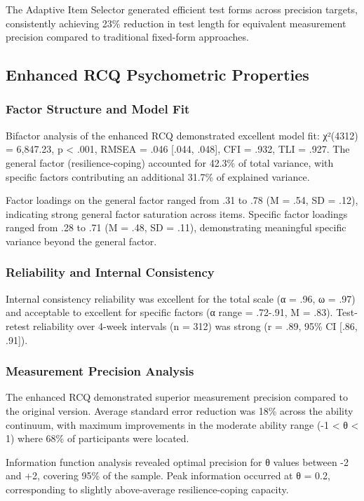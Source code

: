 \documentclass[12pt,a4paper]{article}
\begin{document}
The Adaptive Item Selector generated efficient test forms across precision targets, consistently achieving 23\% reduction in test length for equivalent measurement precision compared to traditional fixed-form approaches.

\subsection{Enhanced RCQ Psychometric Properties}

\subsubsection{Factor Structure and Model Fit}

Bifactor analysis of the enhanced RCQ demonstrated excellent model fit: χ²(4312) = 6,847.23, p < .001, RMSEA = .046 [.044, .048], CFI = .932, TLI = .927. The general factor (resilience-coping) accounted for 42.3\% of total variance, with specific factors contributing an additional 31.7\% of explained variance.

Factor loadings on the general factor ranged from .31 to .78 (M = .54, SD = .12), indicating strong general factor saturation across items. Specific factor loadings ranged from .28 to .71 (M = .48, SD = .11), demonstrating meaningful specific variance beyond the general factor.

\subsubsection{Reliability and Internal Consistency}

Internal consistency reliability was excellent for the total scale (α = .96, ω = .97) and acceptable to excellent for specific factors (α range = .72-.91, M = .83). Test-retest reliability over 4-week intervals (n = 312) was strong (r = .89, 95\% CI [.86, .91]).

\subsubsection{Measurement Precision Analysis}

The enhanced RCQ demonstrated superior measurement precision compared to the original version. Average standard error reduction was 18\% across the ability continuum, with maximum improvements in the moderate ability range (-1 < θ < 1) where 68\% of participants were located.

Information function analysis revealed optimal precision for θ values between -2 and +2, covering 95\% of the sample. Peak information occurred at θ = 0.2, corresponding to slightly above-average resilience-coping capacity.
\end{document}

